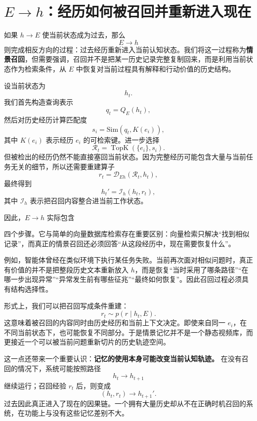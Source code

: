 \section{$E\rightarrow h$：经历如何被召回并重新进入现在}

如果 $h\rightarrow E$ 使当前状态成为过去，那么
\[
\boxed{
E\rightarrow h
}
\]
则完成相反方向的过程：过去经历重新进入当前认知状态。我们将这一过程称为\textbf{情景召回}，但需要强调，召回并不是把某一历史记录完整复制回来，而是利用当前状态作为检索条件，从 $E$ 中恢复对当前过程具有解释和行动价值的历史结构。

设当前状态为
\[
h_t.
\]
我们首先构造查询表示
\[
q_t
=
Q_E(h_t),
\]
然后对历史经历计算匹配度
\[
s_i
=
\mathrm{Sim}
\left(
q_t,
K(e_i)
\right),
\]
其中 $K(e_i)$ 表示经历 $e_i$ 的可检索键。进一步选择
\[
\mathcal R_t
=
\operatorname{TopK}
\left(
\{e_i\},
s_i
\right).
\]
但被检出的经历仍然不能直接塞回当前状态。因为完整经历可能包含大量与当前任务无关的细节，所以还需要重建算子
\[
r_t
=
\mathcal{D}_{Eh}
\left(
\mathcal R_t,
h_t
\right),
\]
最终得到
\[
h_t'
=
\mathcal I_h(h_t,r_t),
\]
其中 $\mathcal I_h$ 表示把召回内容整合进当前工作状态。

因此，$E\rightarrow h$ 实际包含
\begin{statementbox}
\centering
{}
\end{statementbox}
四个步骤。它与简单的向量数据库检索存在重要区别：向量检索只解决“找到相似记录”，而真正的情景召回还必须回答“从这段经历中，现在需要恢复什么”。

例如，智能体曾经在类似环境下执行某任务失败。当前再次面对相似问题时，真正有价值的并不是把整段历史文本重新放入 $h$，而是恢复“当时采用了哪条路径”“在哪一步出现异常”“异常发生前有哪些征兆”“最终如何恢复”。因此召回过程必须具有结构选择性。

形式上，我们可以把召回写成条件重建：
\[
r_t
\sim
p
\left(
r\mid h_t,E
\right).
\]
这意味着被召回的内容同时由历史经历和当前上下文决定。即使来自同一 $e_i$，在不同当前状态下，也可能恢复不同部分。于是情景记忆并不是一个静态视频库，而更接近一个可以被当前问题重新切片的历史轨迹空间。

这一点还带来一个重要认识：\textbf{记忆的使用本身可能改变当前认知轨迹。} 在没有召回的情况下，系统可能按照路径
\[
h_t
\rightarrow
h_{t+1}
\]
继续运行；召回经验 $r_t$ 后，则变成
\[
(h_t,r_t)
\rightarrow
h_{t+1}'.
\]
过去因此真正进入了现在的因果链。一个拥有大量历史却从不在正确时机召回的系统，在功能上与没有这些记忆差别不大。

